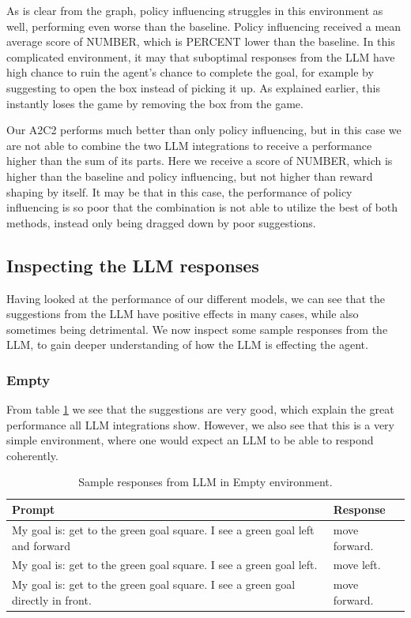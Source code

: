 \documentclass[conference]{IEEEtran}
\begin{document}
As is clear from the graph, policy influencing struggles in this environment as well, performing even worse than the baseline. Policy influencing received a mean average score of NUMBER, which is PERCENT lower than the baseline. In this complicated environment, it may that suboptimal responses from the LLM have high chance to ruin the agent's chance to complete the goal, for example by suggesting to open the box instead of picking it up. As explained earlier, this instantly loses the game by removing the box from the game.

Our A2C2 performs much better than only policy influencing, but in this case we are not able to combine the two LLM integrations to receive a performance higher than the sum of its parts. Here we receive a score of NUMBER, which is higher than the baseline and policy influencing, but not higher than reward shaping by itself. It may be that in this case, the performance of policy influencing is so poor that the combination is not able to utilize the best of both methods, instead only being dragged down by poor suggestions.

\subsection{Inspecting the LLM responses}
\label{llmresponse}

Having looked at the performance of our different models, we can see that the suggestions from the LLM have positive effects in many cases, while also sometimes being detrimental. We now inspect some sample responses from the LLM, to gain deeper understanding of how the LLM is effecting the agent.

\subsubsection{Empty}

From table \ref{emptyresponses} we see that the suggestions are very good, which explain the great performance all LLM integrations show. However, we also see that this is a very simple environment, where one would expect an LLM to be able to respond coherently.

\begin{table}[h]
\caption{Sample responses from LLM in Empty environment.}
\begin{center}
\label{emptyresponses}
\begin{tabularx}{3.25in}{X | X}
Prompt & Response \\
\hline
My goal is: get to the green goal square. I see a green goal left and forward & move forward. \\
My goal is: get to the green goal square. I see a green goal left. & move left. \\
My goal is: get to the green goal square. I see a green goal directly in front. & move forward.
\end{tabularx}
\end{center}
\end{table}
\end{document}
